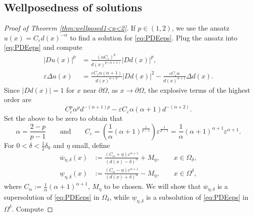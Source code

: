 \documentclass[12pt,reqno]{amsart}
\numberwithin{figure}{section}
\theoremstyle{plain}
\theoremstyle{remark}
\numberwithin{equation}{section}
\begin{document}
\begin{appendices}
\subsection*{Wellposedness of solutions}
\begin{proof} [Proof of Theorem \ref{thm:wellposed1<p<2}] If $p\in (1,2)$, we use the ansatz $ u(x) = C_\varepsilon d(x)^{-\alpha}$ to find a solution for \eqref{eq:PDEeps}. Plug the ansatz into \eqref{eq:PDEeps} and compute 
\begin{equation*}
\begin{split}
    |Du (x)|^p &= \frac{(\alpha C_\varepsilon)^p }{d(x)^{p(\alpha+1)}}|D d(x)|^p,\\
    \varepsilon\Delta u(x) &= \frac{\varepsilon C_\varepsilon\alpha(\alpha+1)}{d(x)^{\alpha+2}}|D d(x)|^2 - \frac{\varepsilon C_\varepsilon\alpha}{d(x)^{\alpha+1}}\Delta d(x).
\end{split}
\end{equation*}
Since $|D d(x)| = 1$ for $x$ near $\partial\Omega$, as $x\to \partial \Omega$, the explosive terms of the highest order are
\begin{equation*}
         C_\varepsilon^p \alpha^p d^{-(\alpha+1)p}  -\varepsilon C_\varepsilon \alpha(\alpha+1)d^{-(\alpha+2)}.
\end{equation*}
Set the above to be zero to obtain that
\begin{equation}\label{e:relation}
    \displaystyle\alpha = \frac{2-p}{p-1} \qquad\text{and}\qquad C_\varepsilon = \left(\frac{1}{\alpha}(\alpha+1)^\frac{1}{p-1}\right) \varepsilon^{\frac{1}{p-1}} = \frac{1}{\alpha}(\alpha+1)^{\alpha+1}\varepsilon^{\alpha+1}.
\end{equation}
For $0<\delta < \frac{1}{2}\delta_0$ and $\eta$ small, define
\begin{equation*}
\begin{split}
    \overline{w}_{\eta,\delta}(x) &:= \frac{(C_\alpha+\eta)\varepsilon^{\alpha+1}}{(d(x)-\delta)^\alpha} + M_\eta, \qquad x\in \Omega_\delta,\\
    \underline{w}_{\eta,\delta}(x) &:= \frac{(C_\alpha-\eta)\varepsilon^{\alpha+1}}{(d(x)+\delta)^\alpha} - M_\eta, \qquad x\in \Omega^\delta,
\end{split}
\end{equation*}
where $C_\alpha := \frac{1}{\alpha} (\alpha+1)^{\alpha+1} $, $M_\eta$ to be chosen. We will show that $\overline{w}_{\eta,\delta}$ is a supersolution of \eqref{eq:PDEeps} in $\Omega_\delta$, while $\underline{w}_{\eta,\delta}$ is a subsolution of \eqref{eq:PDEeps} in $\Omega^\delta$. Compute

\end{proof}
\end{appendices}
\end{document}
